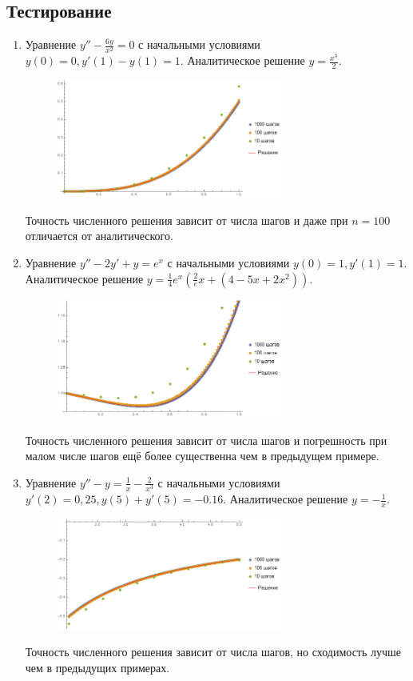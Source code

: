 \documentclass[a4paper,12pt,titlepage,finall]{article}
\begin{document}
\subsection{Тестирование}
\begin{enumerate}
\item
Уравнение $y'' - \frac{6y}{x^2} = 0$ с начальными условиями $y(0) = 0, y'(1) - y(1) = 1$. Аналитическое решение $y = \frac{x^3}{2}$.
\begin{figure}[h]
\centering
\includegraphics[width=0.7\textwidth]{test_2_1.png}
\end{figure}
\par
Точность численного решения зависит от числа шагов и даже при $n = 100$ отличается от аналитического.

\item
Уравнение $y'' - 2y' + y = e^x$ с начальными условиями $y(0) = 1, y'(1) = 1$. Аналитическое решение $y = \frac{1}{4} e^{x} (\frac{2}{e} x + (4 - 5 x + 2 x^2))$.
\begin{figure}[h]
\centering
\includegraphics[width=0.7\textwidth]{test_2_2.png}
\end{figure}
\par
Точность численного решения зависит от числа шагов и погрешность при малом числе шагов ещё более существенна чем в предыдущем примере.
\newpage
\item
Уравнение $y'' - y = \frac{1}{x} - \frac{2}{x^3}$ с начальными условиями $y'(2) = 0,25, y(5) + y'(5) = -0.16$. Аналитическое решение $y = -\frac{1}{x}$.
\begin{figure}[h]
\centering
\includegraphics[width=0.7\textwidth]{test_2_3.png}
\end{figure}
\par
Точность численного решения зависит от числа шагов, но сходимость лучше чем в предыдущих примерах.
\end{enumerate}
\end{document}
